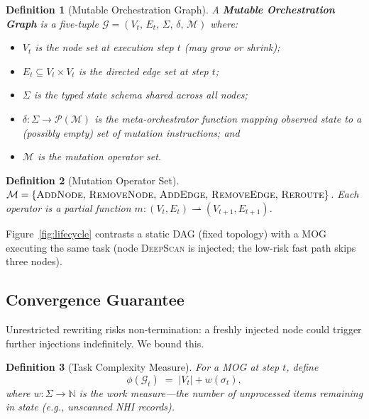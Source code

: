 \documentclass[conference]{IEEEtran}
\newtheorem{definition}{Definition}
\begin{document}
\begin{definition}[Mutable Orchestration Graph]
  A \textbf{Mutable Orchestration Graph} is a five-tuple
  $\mathcal{G} = (V_t,\, E_t,\, \Sigma,\, \delta,\, \mathcal{M})$
  where:
  \begin{itemize}
    \item $V_t$ is the node set at execution step $t$ (may grow or shrink);
    \item $E_t \subseteq V_t \times V_t$ is the directed edge set at
      step $t$;
    \item $\Sigma$ is the typed state schema shared across all nodes;
    \item $\delta\colon \Sigma \to \mathcal{P}(\mathcal{M})$ is the
      \emph{meta-orchestrator function} mapping observed state to a
      (possibly empty) set of mutation instructions; and
    \item $\mathcal{M}$ is the mutation operator set.
  \end{itemize}
\end{definition}

\begin{definition}[Mutation Operator Set]
  $\mathcal{M} = \{\textsc{AddNode},\allowbreak\,\textsc{RemoveNode},\allowbreak
  \,\textsc{AddEdge},\allowbreak\,\textsc{RemoveEdge},\allowbreak
  \,\textsc{Reroute}\}$.
  Each operator is a partial function
  $m\colon (V_t, E_t) \rightharpoonup (V_{t+1}, E_{t+1})$.
\end{definition}

Figure~\ref{fig:lifecycle} contrasts a static DAG (fixed topology)
with a MOG executing the same task (node \textsc{DeepScan} is injected;
the low-risk fast path skips three nodes).

\subsection{Convergence Guarantee}

Unrestricted rewriting risks non-termination: a freshly injected node
could trigger further injections indefinitely. We bound this.

\begin{definition}[Task Complexity Measure]
  For a MOG at step $t$, define
  \[
    \phi(\mathcal{G}_t)\;=\;|V_t| + w(\sigma_t),
  \]
  where $w\colon\Sigma\to\mathbb{N}$ is the \emph{work measure}---the
  number of unprocessed items remaining in state (e.g., unscanned NHI
  records).
\end{definition}
\end{document}
